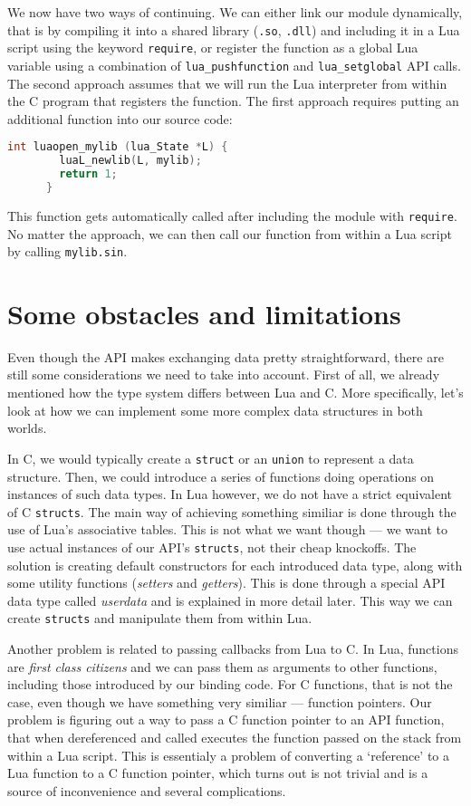 \documentclass[polish, english]{iithesis}
\begin{document}
    We now have two ways of continuing.
    We can either link our module dynamically, that is by compiling it into a shared library (\texttt{.so}, \texttt{.dll}) and including it in a Lua script using the keyword \texttt{require}, or register the function as a global Lua variable using a combination of \texttt{lua\_pushfunction} and \texttt{lua\_setglobal} API calls. 
    The second approach assumes that we will run the Lua interpreter from within the C program that registers the function.
    The first approach requires putting an additional function into our source code:
    \begin{lstlisting}[language=C, caption=The \texttt{luaopen\_mylib} function]
      int luaopen_mylib (lua_State *L) {
        luaL_newlib(L, mylib);
        return 1;
      }
    \end{lstlisting}
    This function gets automatically called after including the module with \texttt{require}.
    No matter the approach, we can then call our function from within a Lua script by calling \texttt{mylib.sin}.
  \section{Some obstacles and limitations}
    Even though the API makes exchanging data pretty straightforward, there are still some considerations we need to take into account.
    First of all, we already mentioned how the type system differs between Lua and C.
    More specifically, let's look at how we can implement some more complex data structures in both worlds.

    In C, we would typically create a \texttt{struct} or an \texttt{union} to represent a data structure.
    Then, we could introduce a series of functions doing operations on instances of such data types.
    In Lua however, we do not have a strict equivalent of C \texttt{structs}.
    The main way of achieving something similiar is done through the use of Lua's associative tables.
    This is not what we want though --- we want to use actual instances of our API's \texttt{structs}, not their cheap knockoffs.
    The solution is creating default constructors for each introduced data type, along with some utility functions (\textit{setters} and \textit{getters}).
    This is done through a special API data type called \textit{userdata} and is explained in more detail later.
    This way we can create \texttt{structs} and manipulate them from within Lua.

    Another problem is related to passing callbacks from Lua to C.
    In Lua, functions are \textit{first class citizens} and we can pass them as arguments to other functions, including those introduced by our binding code.
    For C functions, that is not the case, even though we have something very similiar --- function pointers.
    Our problem is figuring out a way to pass a C function pointer to an API function, that when dereferenced and called executes the function passed on the stack from within a Lua script.
    This is essentialy a problem of converting a `reference' to a Lua function to a C function pointer, which turns out is not trivial and is a source of inconvenience and several complications. 
\end{document}
